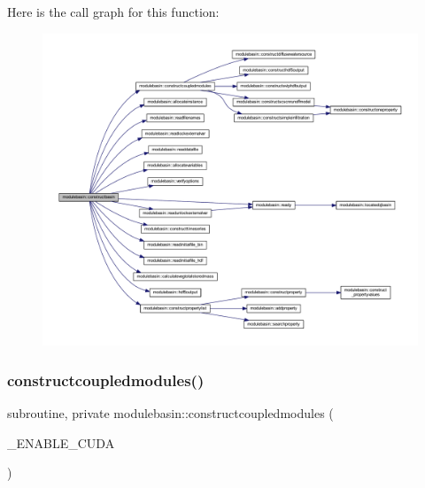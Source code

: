 Here is the call graph for this function\+:\nopagebreak
\begin{figure}[H]
\begin{center}
\leavevmode
\includegraphics[width=350pt]{namespacemodulebasin_a51d97ade316802f4f499db0fb3835e3f_cgraph}
\end{center}
\end{figure}
\mbox{\label{namespacemodulebasin_a3b96c67f2670be0a100bc48d94ecb93d}} 
\subsubsection{\texorpdfstring{constructcoupledmodules()}{constructcoupledmodules()}}
{\footnotesize\ttfamily subroutine, private modulebasin\+::constructcoupledmodules (\begin{DoxyParamCaption}\item[{}]{\+\_\+\+E\+N\+A\+B\+L\+E\+\_\+\+C\+U\+DA }\end{DoxyParamCaption})\hspace{0.3cm}{\ttfamily [private]}}

